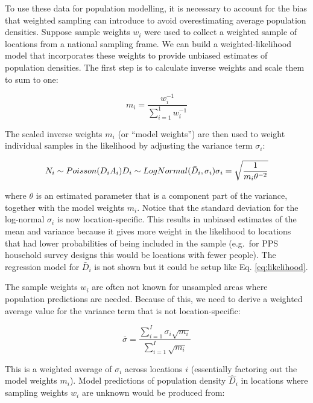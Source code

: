 \documentclass[]{book}
\begin{document}
To use these data for population modelling, it is necessary to account
for the bias that weighted sampling can introduce to avoid
overestimating average population densities. Suppose sample weights
\(w_i\) were used to collect a weighted sample of locations from a
national sampling frame. We can build a weighted-likelihood model that
incorporates these weights to provide unbiased estimates of population
densities. The first step is to calculate inverse weights and scale them
to sum to one:

\begin{equation}
  m_i = \frac{w_i^{-1}}{\sum_{i=1}^1{w_i^{-1}}}
\end{equation}

The scaled inverse weights \(m_i\) (or ``model weights'') are then used
to weight individual samples in the likelihood by adjusting the variance
term \(\sigma_i\):

\begin{equation}
  N_i \sim Poisson( D_i A_i ) \\
  D_i \sim LogNormal( \bar{D}_i , \sigma_i ) \\
  \sigma_i = \sqrt{ \frac{1}{m_i \theta^{-2}} }
  \label{eq:weighted-likelihood}
\end{equation}

where \(\theta\) is an estimated parameter that is a component part of
the variance, together with the model weights \(m_i\). Notice that the
standard deviation for the log-normal \(\sigma_i\) is now
location-specific. This results in unbiased estimates of the mean and
variance because it gives more weight in the likelihood to locations
that had lower probabilities of being included in the sample (e.g.~for
PPS household survey designs this would be locations with fewer people).
The regression model for \(\bar{D}_i\) is not shown but it could be
setup like Eq. \eqref{eq:likelihood}.

The sample weights \(w_i\) are often not known for unsampled areas where
population predictions are needed. Because of this, we need to derive a
weighted average value for the variance term that is not
location-specific:

\[
\bar{\sigma} = \frac{ \sum_{i=1}^I{ \sigma_i \sqrt{m_i} } } { \sum_{i=1}^I{ \sqrt{m_i} } }
\]

This is a weighted average of \(\sigma_i\) across locations \(i\)
(essentially factoring out the model weights \(m_i\)). Model predictions
of population density \(\hat{D}_i\) in locations where sampling weights
\(w_i\) are unknown would be produced from:
\end{document}
